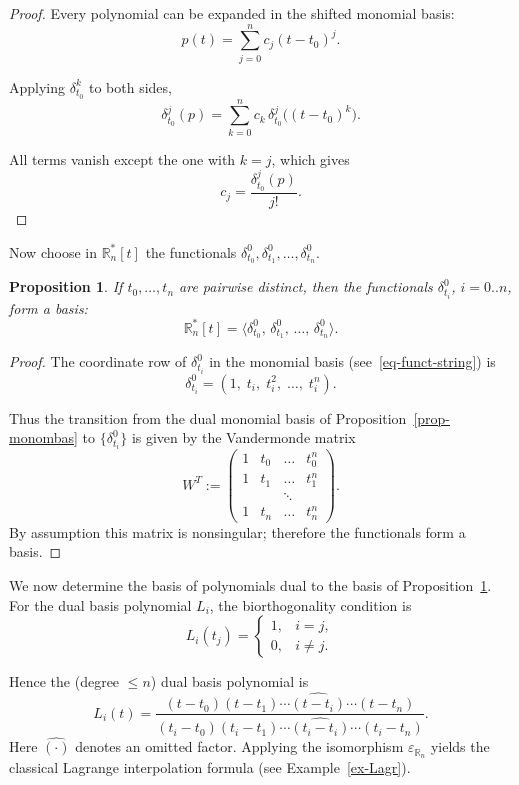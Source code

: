 \documentclass{article}
\newtheorem{proposition}[theorem]{Proposition}	%
\theoremstyle{definition}
\theoremstyle{definition}
\numberwithin{figure}{section}
\newcommand{\1}{\mathbf{1}}
\begin{document}
\begin{proof}
Every polynomial can be expanded in the shifted monomial basis:
\[
    p(t) = \sum_{j=0}^{n} c_j (t - t_0)^j.
\]

Applying $\delta_{t_0}^k$ to both sides,
\[
    \delta_{t_0}^j(p)
    = \sum_{k=0}^n c_k\, \delta_{t_0}^j\bigl((t - t_0)^k\bigr).
\]

All terms vanish except the one with $k = j$, which gives
\[
    c_j = \frac{\delta_{t_0}^j(p)}{j!}.
\]
\end{proof}

Now choose in $\mathbb{R}_n^*[t]$ the functionals \(\delta^0_{t_0}, \delta^0_{t_1}, \ldots, \delta^0_{t_n}\).

\begin{proposition}\label{prop-lagrdualbasis}
If $t_0, \ldots, t_n$ are pairwise distinct, then the functionals $\delta^0_{t_i}$, $i = 0..n$, form a basis:
\[
    \mathbb{R}_n^*[t] = \langle
        \delta^0_{t_0},\, \delta^0_{t_1},\, \ldots,\, \delta^0_{t_n}
    \rangle.
\]
\end{proposition}

\begin{proof}
The coordinate row of $\delta^0_{t_i}$ in the monomial basis (see~\eqref{eq-funct-string}) is
\[
    \delta^0_{t_i} = (1,\; t_i,\; t_i^2,\; \ldots,\; t_i^n).
\]

Thus the transition from the dual monomial basis of Proposition~\ref{prop-monombas} to $\{\delta^0_{t_i}\}$ is given by the Vandermonde matrix
\[
    W^T
    := \begin{pmatrix}
        1 & t_0 & \ldots & t_0^n \\
        1 & t_1 & \ldots & t_1^n \\
           &    & \ddots &        \\
        1 & t_n & \ldots & t_n^n
    \end{pmatrix}.
\]
By assumption this matrix is nonsingular; therefore the functionals form a basis.
\end{proof}

We now determine the basis of polynomials dual to the basis of Proposition~\ref{prop-lagrdualbasis}. For the dual basis polynomial $L_i$, the biorthogonality condition is
\[
    L_i(t_j) =
    \begin{cases}
        1, & i = j,\\
        0, & i \neq j.
    \end{cases}
\]

Hence the (degree $\le n$) dual basis polynomial is
\begin{equation}
    L_i(t)
    = \frac{
        (t - t_0)(t - t_1)\cdots \widehat{(t - t_i)} \cdots (t - t_n)
    }{
        (t_i - t_0)(t_i - t_1)\cdots \widehat{(t_i - t_i)} \cdots (t_i - t_n)
    }.
\end{equation}
Here $\widehat{(\cdot)}$ denotes an omitted factor. Applying the isomorphism $\varepsilon_{\mathbb{R}_n}$ yields the classical Lagrange interpolation formula (see Example~\ref{ex-Lagr}).
\end{document}
